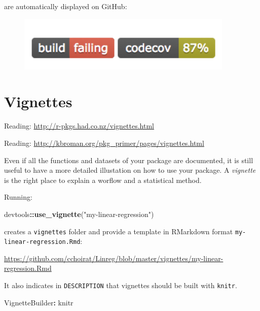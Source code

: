 \documentclass[]{book}
\newenvironment{Shaded}{\begin{snugshade}}{\end{snugshade}}
\newcommand{\KeywordTok}[1]{\textcolor[rgb]{0.13,0.29,0.53}{\textbf{#1}}}
\newcommand{\StringTok}[1]{\textcolor[rgb]{0.31,0.60,0.02}{#1}}
\newcommand{\OperatorTok}[1]{\textcolor[rgb]{0.81,0.36,0.00}{\textbf{#1}}}
\newcommand{\NormalTok}[1]{#1}
\theoremstyle{definition}
\theoremstyle{definition}
\theoremstyle{definition}
\theoremstyle{remark}
\begin{document}
are automatically displayed on GitHub:

\begin{figure}

{\centering \includegraphics[width=4.06in]{images/ch3_badges} 

}

\end{figure}

\section{Vignettes}\label{vignettes}

Reading: \url{http://r-pkgs.had.co.nz/vignettes.html}

Reading: \url{http://kbroman.org/pkg_primer/pages/vignettes.html}

Even if all the functions and datasets of your package are documented,
it is still useful to have a more detailed illustation on how to use
your package. A \emph{vignette} is the right place to explain a worflow
and a statistical method.

Running:

\begin{Shaded}
\begin{Highlighting}[]
\NormalTok{devtools}\OperatorTok{::}\KeywordTok{use_vignette}\NormalTok{(}\StringTok{"my-linear-regression"}\NormalTok{)}
\end{Highlighting}
\end{Shaded}

creates a \texttt{vignettes} folder and provide a template in RMarkdown
format \texttt{my-linear-regression.Rmd}:

\url{https://github.com/cchoirat/Linreg/blob/master/vignettes/my-linear-regression.Rmd}

It also indicates in \texttt{DESCRIPTION} that vignettes should be built
with \texttt{knitr}.

\begin{Shaded}
\begin{Highlighting}[]
\NormalTok{VignetteBuilder}\OperatorTok{:}\StringTok{ }\NormalTok{knitr}
\end{Highlighting}
\end{Shaded}
\end{document}
